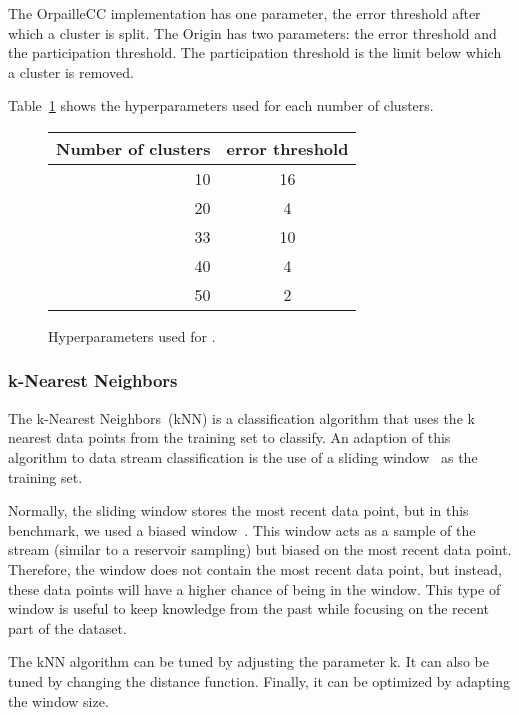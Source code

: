 The \mcnn OrpailleCC implementation has one
parameter, the error threshold after which a
cluster is split.  The \mcnn Origin has two
parameters: the error threshold and the
participation threshold. The participation
threshold is the limit below which a cluster is
removed.

Table~\ref{table:hyperparameter-mcnn} shows
the hyperparameters used for each number of clusters.
\begin{figure}
		\begin{center}
			\begin{tabular}{|| r | c ||} 
				\hline
				Number of clusters &  error threshold \\ [0.5ex] 
				\hline\hline
				10 & 16 \\
				20 & 4 \\
				33 & 10 \\
				40 & 4 \\
				50 & 2 \\
				\hline
			\end{tabular}
		\end{center}
		\caption{Hyperparameters used for \mcnn.}
		\label{table:hyperparameter-mcnn}
\end{figure}

\subsubsection{k-Nearest Neighbors}

The k-Nearest Neighbors~(kNN) is a classification
algorithm that uses the k nearest data points from
the training set to classify.  An adaption of this
algorithm to data stream classification is the use
of a sliding window~\cite{Mining_Massive_Datasets}
as the training set.

Normally, the sliding window stores the most
recent data point, but in this benchmark, we used
a biased window~\cite{biased_reservoir_sampling}.
This window acts as a sample of
the stream (similar to a reservoir sampling) but
biased on the most recent data point.  Therefore,
the window does not contain the most recent data
point, but instead, these data points will have a
higher chance of being in the window.  This type
of window is useful to keep knowledge from the
past while focusing on the recent part of the
dataset.

The kNN algorithm can be tuned by adjusting the
parameter k. It can also be tuned by changing the
distance function. Finally, it can be optimized by
adapting the window size.

